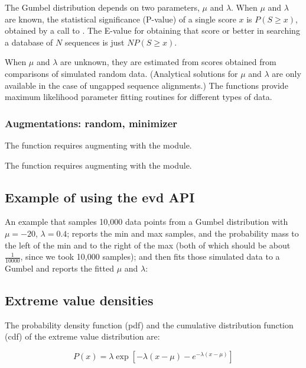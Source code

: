 The Gumbel distribution depends on two parameters, $\mu$ and
$\lambda$. When $\mu$ and $\lambda$ are known, the statistical
significance (P-value) of a single score $x$ is $P(S \geq x)$,
obtained by a call to .  The E-value for
obtaining that score or better in searching a database of $N$
sequences is just $N P(S \geq x)$.

When $\mu$ and $\lambda$ are unknown, they are estimated from scores
obtained from comparisons of simulated random data. (Analytical
solutions for $\mu$ and $\lambda$ are only available in the case of
ungapped sequence alignments.)  The  functions
provide maximum likelihood parameter fitting routines for different
types of data. 

\subsubsection{Augmentations: random, minimizer}

The  function requires augmenting with the
 module.

The  function requires augmenting with
the  module.


\subsection{Example of using the evd API}

An example that samples 10,000 data points from a Gumbel distribution
with $\mu=-20$, $\lambda=0.4$; reports the min and max samples, and
the probability mass to the left of the min and to the right of the
max (both of which should be about $\frac{1}{10000}$, since we took
10,000 samples); and then fits those simulated data to a Gumbel and
reports the fitted $\mu$ and $\lambda$:





\subsection{Extreme value densities}

The probability density function (pdf) and the cumulative distribution
function (cdf) of the extreme value distribution are:

\begin{equation}
P(x) = \lambda \exp \left[ -\lambda (x - \mu) - e^{- \lambda (x - \mu)} \right]
\label{eqn:density}
\end{equation}

